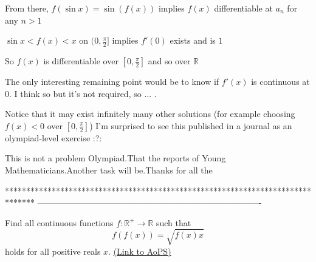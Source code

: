 \begin{solution}
From there, $f(\sin x)=\sin (f(x))$ implies $f(x)$ differentiable at $a_n$ for any $n>1$

$\sin x<f(x)<x$ on $(0,\frac{\pi}2]$ implies $f'(0)$ exists and is $1$

So $f(x)$ is differentiable over $[0,\frac{\pi}2]$ and so over $\mathbb R$

The only interesting remaining point would be to know if $f'(x)$ is continuous at $0$. I think so but it's not required, so ... .


Notice that it may exist infinitely many other solutions (for example choosing $f(x)<0$ over $[0,\frac{\pi}2]$)
I'm surprised to see this published in a journal as an olympiad-level exercise :?:
\end{solution}



\begin{solution}
	This is not a problem Olympiad.That the reports of Young Mathematicians.Another task will be.Thanks for all the 
\end{solution}
*******************************************************************************
-------------------------------------------------------------------------------

\begin{problem}
	Find all continuous functions $f: \mathbb{R}^+ \to\mathbb{R}$ such that
\[f(f(x))=\sqrt{f(x)x}\]
holds for all positive reals $x$.
	\flushright \href{https://artofproblemsolving.com/community/c6h446102}{(Link to AoPS)}
\end{problem}



